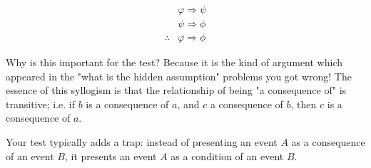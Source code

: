 \documentclass[a4paper, 12pt]{article}
\begin{document}
\begin{align*}
    &\varphi \Rightarrow \psi \\ 
    &\psi \Rightarrow \phi \\ 
    \therefore &\varphi \Rightarrow \phi
\end{align*}

Why is this important for the test? Because it is the kind of argument which
appeared in the "what is the hidden assumption" problems you got wrong! The
essence of this syllogism is that the relationship of being "a consequence of"
is transitive; i.e. if $b$ is a consequence of $a$, and $c$ a consequence of
$b$, then $c$ is a consequence of $a$.

Your test typically adds a trap: instead of presenting an event $A$ as a consequence 
of an event $B$, it presents an event $A$ as a condition of an event $B$.
\end{document}
